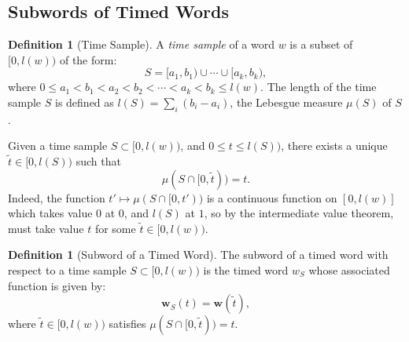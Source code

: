 \documentclass[10pt]{amsproc}
\theoremstyle{definition}
\newtheorem{definition}[theorem]{Definition}
\theoremstyle{remark}
\begin{document}
\subsection{Subwords of Timed Words}
\label{sec:subwords-timed-words}
\begin{definition}
  [Time Sample]
  A \emph{time sample} of a word $w$ is a subset of $[0,l(w))$ of the form:
  \begin{displaymath}
    S = [a_1,b_1)\cup \dotsb \cup [a_k,b_k),
  \end{displaymath}
  where $0\leq a_1 < b_1 < a_2 < b_2 < \dotsb <a_k < b_k \leq l(w)$.
  The length of the time sample $S$ is defined as $l(S)=\sum_i (b_i-a_i)$, the Lebesgue measure $\mu(S)$ of $S$.
\end{definition}
Given a time sample $S\subset [0, l(w))$, and $0\leq t\leq l(S))$, there exists a unique $\tilde t\in [0, l(S))$ such that
\begin{displaymath}
  \mu(S\cap [0,\tilde t)) = t.
\end{displaymath}
Indeed, the function $t'\mapsto \mu(S\cap [0,t'))$ is a continuous function on $[0,l(w)]$ which takes value $0$ at $0$, and $l(S)$ at $1$, so by the intermediate value theorem, must take value $t$ for some $\tilde t \in [0, l(w))$. 
\begin{definition}
  [Subword of a Timed Word]
  \label{definition:timed-subword}
  The subword of a timed word with respect to a time sample $S\subset [0, l(w))$ is the timed word $w_S$ whose associated function is given by:
  \begin{displaymath}
    \mathbf w_S(t) =  \mathbf w(\tilde t),
  \end{displaymath}
  where $\tilde t\in [0,l(w))$ satisfies $\mu(S\cap [0, \tilde t)) = t$.
\end{definition}
\end{document}
